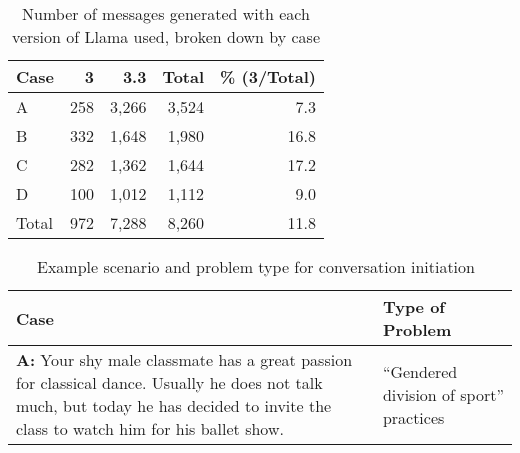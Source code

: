 
\begin{table}[ht]
\centering
\begin{tabular}{lrrrr}
\textbf{Case} & \textbf{3} & \textbf{3.3} & \textbf{Total} & \textbf{\% (3/Total)} \\
\hline
A     &   258 &  3,266 &  3,524 &   7.3 \\
B     &   332 &  1,648 &  1,980 &  16.8 \\
C     &   282 &  1,362 &  1,644 &  17.2 \\ 
D     &   100 &  1,012 &  1,112 &   9.0 \\ 
\hline
Total &   972 &  7,288 &  8,260 &  11.8 \\
\hline
\end{tabular}
\caption{Number of messages generated with each version of Llama used, broken down by case}
\label{t:llama-versions}
\end{table}

\begin{table}[ht]
\centering
\begin{tabularx}{\columnwidth}{XX}
\textbf{Case} & \textbf{Type of Problem}\\
\hline
\textbf{A:}
Your shy male classmate has a great passion for classical dance.
Usually he does not talk much, but today he has decided to invite the class to watch him for his ballet show. &

``Gendered division of sport'' practices \\
\hline
    \end{tabularx}
    \caption{Example scenario and problem type for conversation initiation~\cite{sprugnoli-etal-2018-creating}}
    \label{t:whatsapp-scenarios} 
\end{table}


